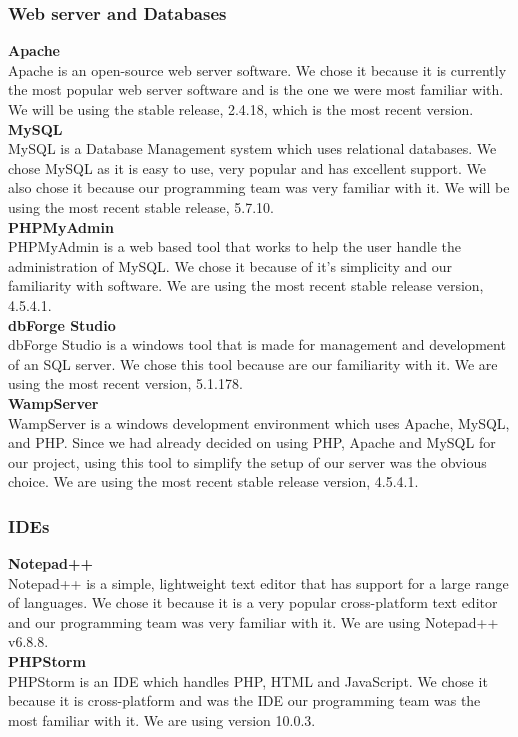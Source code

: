 \documentclass[12pt]{article}
\begin{document}
\subsubsection{Web server and Databases} \label{webanddata} 
\textbf{Apache}\\
Apache is an open-source web server software. We chose it because it is currently the most popular web server software and is the one we were most familiar with. We will be using the stable release, 2.4.18, which is the most recent version.
\\
%
\textbf{MySQL}\\
MySQL is a Database Management system which uses relational databases. We chose MySQL as it is easy to use, very popular and has excellent support. We also chose it because our programming team was very familiar with it. We will be using the most recent stable release, 5.7.10.
\\
%
\textbf{PHPMyAdmin}\\
PHPMyAdmin is a web based tool that works to help the user handle the administration of MySQL. We chose it because of it's simplicity and our familiarity with software. We are using the most recent stable release version, 4.5.4.1.
\\
%
\textbf{dbForge Studio}\\
dbForge Studio is a windows tool that is made for management and development of an SQL server. We chose this tool because are our familiarity with it. We are using the most recent version, 5.1.178.
\\
%
\textbf{WampServer}\\
WampServer is a windows development environment which uses Apache, MySQL, and PHP. Since we had already decided on using PHP, Apache and MySQL for our project, using this tool to simplify the setup of our server was the obvious choice. We are using the most recent stable release version, 4.5.4.1.
\\
%
\subsubsection{IDEs}
\textbf{Notepad++}\\
Notepad++ is a simple, lightweight text editor that has support for a large range of languages. We chose it because it is a very popular cross-platform text editor and our programming team was very familiar with it. We are using Notepad++ v6.8.8.
\\
%
\textbf{PHPStorm}\\
PHPStorm is an IDE which handles PHP, HTML and JavaScript. We chose it because it is cross-platform and was the IDE our programming team was the most familiar with it. We are using version 10.0.3.
\\
%
%
%
\end{document}
